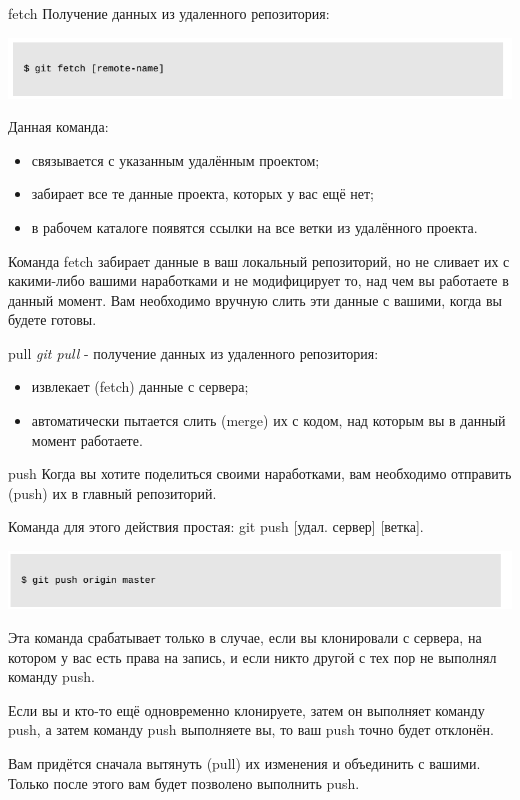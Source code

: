 \documentclass{beamer}
\begin{document}
\begin{frame}{fetch}
Получение данных из удаленного репозитория:
\begin{center}
\includegraphics[scale=0.4]{images/fetch.png}
\end{center}
Данная команда:
\begin{itemize}
\item связывается с указанным удалённым проектом;
\item забирает все те данные проекта, которых у вас ещё нет;
\item в рабочем каталоге появятся ссылки на все ветки из удалённого проекта.
\end{itemize}
Команда fetch забирает данные в ваш локальный репозиторий, но не сливает их с какими-либо вашими наработками и не модифицирует то, над чем вы работаете в данный момент. Вам необходимо вручную слить эти данные с вашими, когда вы будете готовы.
\end{frame}

\begin{frame}{pull}
\textit{git pull} - получение данных из удаленного репозитория:
\begin{itemize}
\item извлекает (fetch) данные с сервера;
\item автоматически пытается слить (merge) их с кодом, над которым вы в данный момент работаете.
\end{itemize}
\end{frame}

\begin{frame}{push}
Когда вы хотите поделиться своими наработками, вам необходимо отправить (push) их в главный репозиторий. 

Команда для этого действия простая: git push [удал. сервер] [ветка].
\begin{center}
\includegraphics[scale=0.4]{images/push.png}
\end{center}
Эта команда срабатывает только в случае, если вы клонировали с сервера, на котором у
вас есть права на запись, и если никто другой с тех пор не выполнял команду push. 

Если вы и кто-то ещё одновременно клонируете, затем он выполняет команду push, а затем команду push
выполняете вы, то ваш push точно будет отклонён. 

Вам придётся сначала вытянуть (pull) их
изменения и объединить с вашими. Только после этого вам будет позволено выполнить push.
\end{frame}
\end{document}
